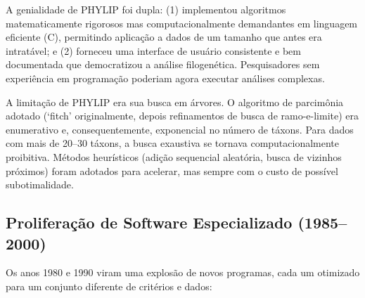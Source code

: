 A genialidade de PHYLIP foi dupla: (1) implementou algoritmos matematicamente rigorosos mas computacionalmente demandantes em linguagem eficiente (C), permitindo aplicação a dados de um tamanho que antes era intratável; e (2) forneceu uma interface de usuário consistente e bem documentada que democratizou a análise filogenética. Pesquisadores sem experiência em programação poderiam agora executar análises complexas.

A limitação de PHYLIP era sua busca em árvores. O algoritmo de parcimônia adotado (`fitch' originalmente, depois refinamentos de busca de ramo-e-limite) era enumerativo e, consequentemente, exponencial no número de táxons. Para dados com mais de 20--30 táxons, a busca exaustiva se tornava computacionalmente proibitiva. Métodos heurísticos (adição sequencial aleatória, busca de vizinhos próximos) foram adotados para acelerar, mas sempre com o custo de possível subotimalidade.

\subsection{Proliferação de Software Especializado (1985--2000)}

Os anos 1980 e 1990 viram uma explosão de novos programas, cada um otimizado para um conjunto diferente de critérios e dados:

